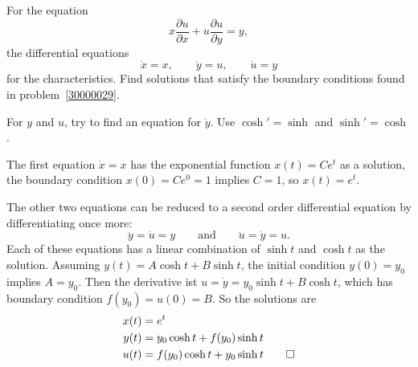 For the equation 
\[
x
\frac{\partial u}{\partial x}
+
u
\frac{\partial u}{\partial y}
=
y,
\]
the differential equations
\[
\dot{x} = x,\qquad
\dot{y} = u,\qquad
\dot{u} = y
\]
for the characteristics.
Find solutions that satisfy the boundary conditions found in
problem~\ref{30000029}.

\begin{hinweis}
For $y$ and $u$, try to find an equation for $\ddot{y}$. 
Use $\cosh'=\sinh$ and $\sinh'=\cosh$.
\end{hinweis}

\begin{loesung}
The first equation $\dot{x}=x$ has the exponential function $x(t)=Ce^t$
as a solution, the boundary condition $x(0)=Ce^0 = 1$ implies $C=1$, so
$x(t)=e^t$.

The other two equations can be reduced to a second order differential
equation by differentiating once more:
\[
\ddot{y}=\dot{u}=y
\qquad\text{and}\qquad
\ddot{u}=\dot{y}=u.
\]
Each of these equations has a linear combination of $\sinh t$ and $\cosh t$
as the solution.
Assuming $y(t) = A\cosh t + B \sinh t$, the initial condition $y(0)=y_0$
implies $A=y_0$.
Then the derivative ist $u=\dot{y}=y_0\sinh t+B\cosh t$, which has
boundary condition $f(y_0) = u(0) = B$.
So the solutions are
\begin{align*}
x(t) &= e^t \\
y(t) &= y_0 \cosh t + f(y_0) \sinh t \\
u(t) &= f(y_0) \cosh t + y_0 \sinh t
\qedhere
\end{align*}
\end{loesung}
